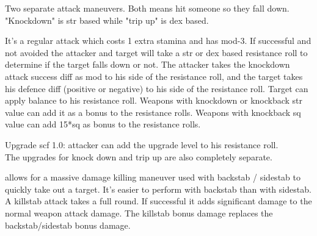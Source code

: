 %


 Two separate attack maneuvers. Both means hit someone so they fall down. "Knockdown" is str based while "trip up" is dex based.

It's a regular attack which costs 1 extra stamina and has mod-3. If successful and not avoided the attacker and target will take a str or dex based resistance roll to determine if the target falls down or not. The attacker takes the knockdown attack success diff as mod to his side of the resistance roll, and the target takes his defence diff (positive or negative) to his side of the resistance roll. Target can apply balance to his resistance roll. Weapons with knockdown or knockback str value can add it as a bonus to the resistance rolls. Weapons with knockback sq value can add 15*sq as bonus to the resistance rolls.

\noindent
Upgrade scf 1.0: attacker can add the upgrade level to his resistance roll.\\
The upgrades for knock down and trip up are also completely separate.


 allows for a massive damage killing maneuver used with backstab / sidestab to quickly take out a target. It's easier to perform with backstab than with sidestab. A killstab attack takes a full round. If successful it adds significant damage to the normal weapon attack damage. The killstab bonus damage replaces the backstab/sidestab bonus damage.

